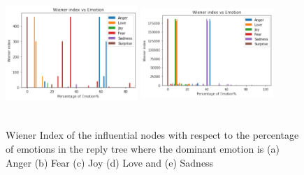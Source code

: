 \begin{figure}[h]
\begin{minipage}{.5\textwidth}
    \centering
    \includegraphics[width=5cm,height=5.5cm,keepaspectratio]{plots/weiner_love.pdf}
  \end{minipage}%
  \begin{minipage}{.5\textwidth}
    \centering
    \includegraphics[width=5cm,height=5.5cm,keepaspectratio]{plots/weiner_sad.pdf}
  \end{minipage}
  
  \caption{Wiener Index of the influential nodes with respect to the percentage of emotions in the reply tree where the dominant emotion is (a) Anger (b) Fear (c) Joy (d) Love and (e) Sadness}
  \label{SampleConvw}
  \end{figure}

